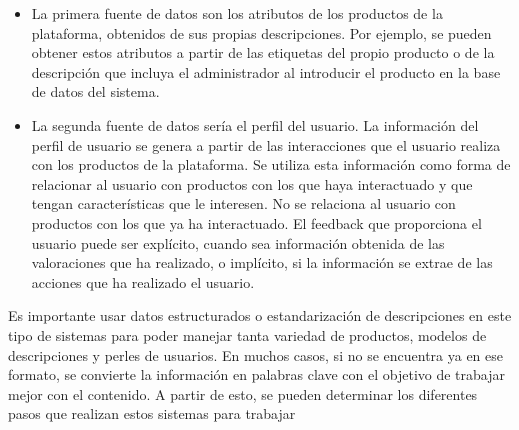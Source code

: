 \documentclass[11pt,a4paper]{article}
\begin{document}
		 \begin{itemize}
		 	\item La primera fuente de datos son los atributos de los productos de la plataforma, obtenidos de sus propias descripciones. Por ejemplo, se pueden obtener estos atributos a partir de las etiquetas del propio producto o de la descripción que incluya el administrador al introducir el producto en la base de datos del sistema. 
		 	
		 	\item La segunda fuente de datos sería el perfil del usuario. La información del perfil de usuario se genera a partir de las interacciones que el usuario realiza con los productos de la plataforma. Se utiliza esta información como forma de relacionar al usuario con productos con los que haya interactuado y que tengan características que le interesen. No se relaciona al usuario con productos con los que ya ha interactuado. El feedback que proporciona el usuario puede ser explícito, cuando sea información obtenida de las valoraciones que ha realizado, o implícito, si la información se extrae de las acciones que ha realizado el usuario. 
		 \end{itemize}
		 
		 Es importante usar datos estructurados o estandarización de descripciones en este tipo de sistemas para poder manejar tanta variedad de productos, modelos de descripciones y perles de usuarios. En muchos casos, si no se encuentra ya en ese formato, se convierte la información en palabras clave con el objetivo de trabajar mejor con el contenido. A partir de esto, se pueden determinar los diferentes pasos que realizan estos sistemas para trabajar
		 
\end{document}
